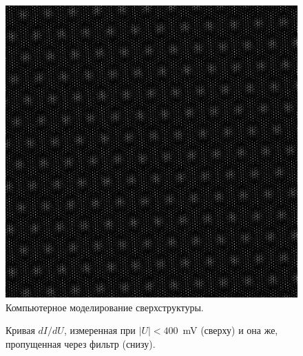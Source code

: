 \documentclass[a4paper, 12pt]{article}
\begin{document}
	\begin{figure}[H]
		\centering
		\includegraphics[width=0.9\linewidth]{../STM_data/Muar/Muar model}
		\caption{Компьютерное моделирование сверхструктуры.}
		\label{fig:2_muar_model}
	\end{figure}
	
	\begin{figure}[H]
		\centering
		\caption{Кривая $dI/dU$, измеренная при $|U| < 400$~mV (сверху) и она же, пропущенная через фильтр (снизу).}
		\label{fig:3_STS}
	\end{figure}
	
\end{document}
